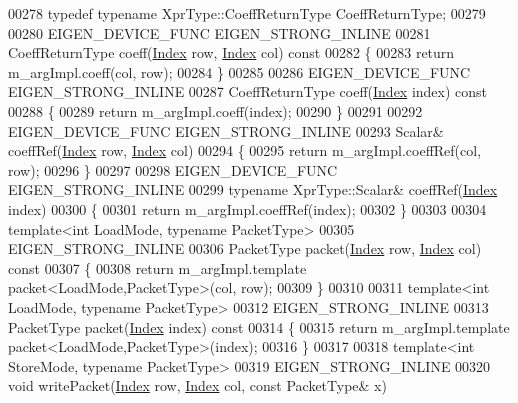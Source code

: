 \begin{DoxyCode}
00278   \textcolor{keyword}{typedef} \textcolor{keyword}{typename} XprType::CoeffReturnType CoeffReturnType;
00279 
00280   EIGEN\_DEVICE\_FUNC EIGEN\_STRONG\_INLINE
00281   CoeffReturnType coeff(\hyperlink{namespace_eigen_a62e77e0933482dafde8fe197d9a2cfde}{Index} row, \hyperlink{namespace_eigen_a62e77e0933482dafde8fe197d9a2cfde}{Index} col)\textcolor{keyword}{ const}
00282 \textcolor{keyword}{  }\{
00283     \textcolor{keywordflow}{return} m\_argImpl.coeff(col, row);
00284   \}
00285 
00286   EIGEN\_DEVICE\_FUNC EIGEN\_STRONG\_INLINE
00287   CoeffReturnType coeff(\hyperlink{namespace_eigen_a62e77e0933482dafde8fe197d9a2cfde}{Index} index)\textcolor{keyword}{ const}
00288 \textcolor{keyword}{  }\{
00289     \textcolor{keywordflow}{return} m\_argImpl.coeff(index);
00290   \}
00291 
00292   EIGEN\_DEVICE\_FUNC EIGEN\_STRONG\_INLINE
00293   Scalar& coeffRef(\hyperlink{namespace_eigen_a62e77e0933482dafde8fe197d9a2cfde}{Index} row, \hyperlink{namespace_eigen_a62e77e0933482dafde8fe197d9a2cfde}{Index} col)
00294   \{
00295     \textcolor{keywordflow}{return} m\_argImpl.coeffRef(col, row);
00296   \}
00297 
00298   EIGEN\_DEVICE\_FUNC EIGEN\_STRONG\_INLINE
00299   \textcolor{keyword}{typename} XprType::Scalar& coeffRef(\hyperlink{namespace_eigen_a62e77e0933482dafde8fe197d9a2cfde}{Index} index)
00300   \{
00301     \textcolor{keywordflow}{return} m\_argImpl.coeffRef(index);
00302   \}
00303 
00304   \textcolor{keyword}{template}<\textcolor{keywordtype}{int} LoadMode, \textcolor{keyword}{typename} PacketType>
00305   EIGEN\_STRONG\_INLINE
00306   PacketType packet(\hyperlink{namespace_eigen_a62e77e0933482dafde8fe197d9a2cfde}{Index} row, \hyperlink{namespace_eigen_a62e77e0933482dafde8fe197d9a2cfde}{Index} col)\textcolor{keyword}{ const}
00307 \textcolor{keyword}{  }\{
00308     \textcolor{keywordflow}{return} m\_argImpl.template packet<LoadMode,PacketType>(col, row);
00309   \}
00310 
00311   \textcolor{keyword}{template}<\textcolor{keywordtype}{int} LoadMode, \textcolor{keyword}{typename} PacketType>
00312   EIGEN\_STRONG\_INLINE
00313   PacketType packet(\hyperlink{namespace_eigen_a62e77e0933482dafde8fe197d9a2cfde}{Index} index)\textcolor{keyword}{ const}
00314 \textcolor{keyword}{  }\{
00315     \textcolor{keywordflow}{return} m\_argImpl.template packet<LoadMode,PacketType>(index);
00316   \}
00317 
00318   \textcolor{keyword}{template}<\textcolor{keywordtype}{int} StoreMode, \textcolor{keyword}{typename} PacketType>
00319   EIGEN\_STRONG\_INLINE
00320   \textcolor{keywordtype}{void} writePacket(\hyperlink{namespace_eigen_a62e77e0933482dafde8fe197d9a2cfde}{Index} row, \hyperlink{namespace_eigen_a62e77e0933482dafde8fe197d9a2cfde}{Index} col, \textcolor{keyword}{const} PacketType& x)

\end{DoxyCode}
